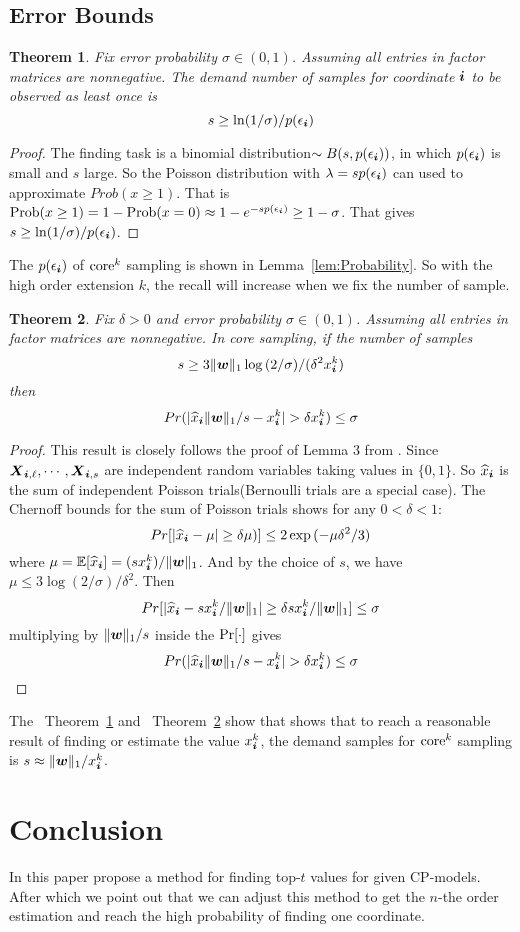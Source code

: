\documentclass[letterpaper]{article}
\newcommand{\score}[1]{\M{X}_{\V{i},#1}}
\newcommand{\V}[1]{{\bm{{\MakeLowercase{#1}}}}}
\newcommand{\M}[1]{{\bm{{\MakeUppercase{#1}}}}}
\newcommand{\norm}[2]{\|#1\|_{#2}}
\newcommand{\Lem}[1]  {Lemma~\ref{lem:#1}}
\newcommand{\Theo}[1] {Theorem~\ref{theo:#1}}
\newcommand{\predx}{\widehat{x}_{\V{i}}}
\newtheorem{theorem}{Theorem}
\begin{document}
\subsection{Error Bounds}
\begin{theorem}\label{theo:ObservationBound}
Fix error probability $\sigma \in (0,1)$.
Assuming all entries in factor matrices are nonnegative.
The demand number of samples for coordinate $\V{i}$ to be observed as least once is
\[
    s \geq \ln(1/\sigma)/p(\epsilon_{\V{i}})
\]
\end{theorem}
\begin{proof}
The finding task is a binomial distribution$\sim B(s,p(\epsilon_{\V{i}}))$,
in which $p(\epsilon_{\V{i}})$ is small and $s$ large.
So the Poisson distribution with $\lambda = sp(\epsilon_{\V{i}})$
can used to approximate $Prob(x\geq1)$.
That is ${\rm Prob}(x\geq1) = 1-{\rm Prob}(x=0)\approx 1-e^{-sp(\epsilon_{\V{i}})} \geq 1-\sigma$.
That gives $s \geq \ln(1/\sigma)/p(\epsilon_{\V{i}})$.
\end{proof}
The $p(\epsilon_{\V{i}})$ of ${\rm core}^k$ sampling is shown in \Lem{Probability}.
So with the high order extension $k$, the recall will increase when we fix the number of sample.
\begin{theorem}\label{theo:Bound}
Fix $\delta > 0$ and error probability $\sigma \in (0,1)$.
Assuming all entries in factor matrices are nonnegative.
In core sampling, if the number of samples
\[
    s \geq 3\norm{\V{w}}{1}\log{(2/\sigma)}/(\delta^2 x^k_{\V{i}})
\]
then
\[
    Pr(|\predx\norm{\V{W}}{1}/s - x^k_{\V{i}}| > \delta x^k_{\V{i}}) \leq \sigma
\]
\end{theorem}

\begin{proof}
This result is closely follows the proof of Lemma 3 from \cite{BaPiKoSe15}.
Since  $ \score{\ell},\cdots,\score{s} $
are independent random variables taking values in $\{0,1\}$.
So $\predx$ is the sum of independent Poisson trials(Bernoulli trials are a special case).
The Chernoff bounds for the sum of Poisson trials shows for any $0 <\delta <1 $:
\[
    Pr[|\predx - \mu|\geq\delta\mu)] \leq 2\exp{(-\mu\delta^2/3)}
\]
where $\mu=\mathbb{E}[\predx]=(sx^k_{\V{i}})/\norm{\V{W}}{1}$.
And by the choice of $s$, we have
$\mu\leq 3\log{(2/\sigma)/\delta^2}$.
Then
\[
    Pr[|\predx-sx^k_{\V{i}}/\norm{\V{W}}{1}|\geq\delta sx^k_{\V{i}}/\norm{\V{W}}{1}] \leq \sigma
\]
multiplying by $\norm{\V{W}}{1}/s$ inside the ${\rm Pr}[\cdot]$ gives
\[
    Pr(|\predx\norm{\V{W}}{1}/s - x^k_{\V{i}}| > \delta x^k_{\V{i}}) \leq \sigma
\]
\end{proof}
The ~\Theo{ObservationBound} and ~\Theo{Bound} show that shows that
to reach a reasonable result of finding or estimate the value $x^k_{\V{i}}$,
the demand samples for ${\rm core}^k$ sampling is $s\approx \norm{\V{w}}{1}/x_{\V{i}}^k$.

\section{Conclusion}
In this paper propose a method for finding top-$t$ values for given CP-models.
After which we point out that we can adjust this method to get the $n$-the order estimation
and reach the high probability of finding one coordinate.


\end{document}
